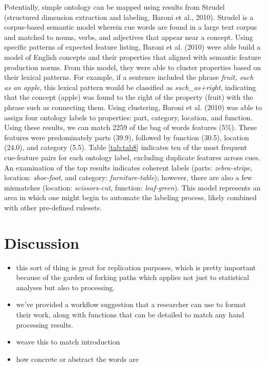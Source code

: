 \documentclass[man]{apa6}
\begin{document}
Potentially, simple ontology can be mapped using results from Strudel (structured dimension extraction and labeling, Baroni et al., 2010). Strudel is a corpus-based semantic model wherein cue words are found in a large text corpus and matched to nouns, verbs, and adjectives that appear near a concept. Using specific patterns of expected feature listing, Baroni et al. (2010) were able build a model of English concepts and their properties that aligned with semantic feature production norms. From this model, they were able to cluster properties based on their lexical patterns. For example, if a sentence included the phrase \emph{fruit, such as an apple}, this lexical pattern would be classified as \emph{such\_as+right}, indicating that the concept (apple) was found to the right of the property (fruit) with the phrase such as connecting them. Using clustering, Baroni et al. (2010) was able to assign four ontology labels to properties: part, category, location, and function. Using these results, we can match 2259 of the bag of words features (5\%). These features were predominately parts (39.9), followed by function (30.5), location (24.0), and category (5.5). Table \ref{tab:tab8} indicates ten of the most frequent cue-feature pairs for each ontology label, excluding duplicate features across cues. An examination of the top results indicates coherent labels (parts: \emph{zebra-stripe}, location: \emph{shoe-foot}, and category: \emph{furniture-table}); however, there are also a few mismatches (location: \emph{scissors-cut}, function: \emph{leaf-green}). This model represents an area in which one might begin to automate the labeling process, likely combined with other pre-defined rulesets.

\hypertarget{discussion}{%
\section{Discussion}\label{discussion}}

\begin{itemize}
\item
  this sort of thing is great for replication purposes, which is pretty important because of the garden of forking paths which applies not just to statistical analyses but also to processing.
\item
  we've provided a workflow suggestion that a researcher can use to format their work, along with functions that can be detailed to match any hand processing results.
\item
  weave this to match introduction
\item
  how concrete or abstract the words are
\end{itemize}
\end{document}

